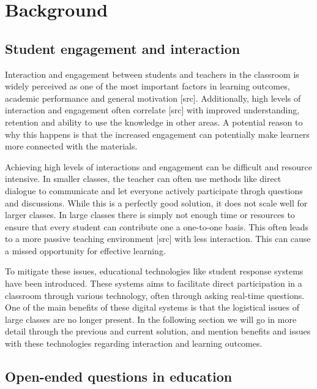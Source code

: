 \chapter{Background}\label{sec:background}


\section{Student engagement and interaction}


Interaction and engagement between students and teachers in the classroom is widely perceived as one of the most important factors in learning outcomes, academic performance and general motivation [src]. Additionally, high levels of interaction and engagement often correlate [src] with improved understanding, retention and ability to use the knowledge in other areas. A potential reason to why this happens is that the increased engagement can potentially make learners more connected with the materials. 

Achieving high levels of interactions and engagement can be difficult and resource intensive. In smaller classes, the teacher can often use methods like direct dialogue to communicate and let everyone actively participate throgh questions and discussions. While this is a perfectly good solution, it does not scale well for larger classes. In large classes there is simply not enough time or resources to ensure that every student can contribute one a one-to-one basis. This often leads to a more passive teaching environment [src] with less interaction. This can cause a missed opportunity for effective learning. 

To mitigate these issues, educational technologies like student response systems have been introduced. These systems aims to facilitate direct participation in a classroom through various technology, often through asking real-time questions. One of the main benefits of these digital systems is that the logistical issues of large classes are no longer present. In the following section we will go in more detail through the previous and current solution, and mention benefits and issues with these technologies regarding interaction and learning outcomes. 



\section{Open-ended questions in education}



